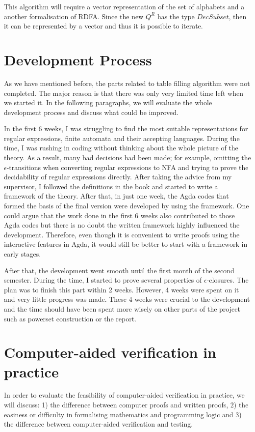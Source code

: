 \par This algorithm will require a vector representation of the set of
alphabets and a another formalisation of RDFA. Since the new \(Q^R\) has
the type \(DecSubset\), then it can be represented by a vector and
thus it is possible to iterate. 


\section{Development Process}
\par As we have mentioned before, the parts related to table filling algorithm were not completed. The major reason is
that there was only very limited time left when we started it. In the following paragraphs, we will evaluate the whole
development process and discuss what could be improved. 

\par In the first 6 weeks, I was struggling to find
the most suitable representations for regular expressions, finite
automata and their accepting languages. During the time, I was
rushing in coding without thinking about the whole picture of
the theory. As a result, many bad decisions had been made; for example, omitting the
\(\epsilon\)-transitions when converting regular expressions to NFA and trying to prove
the decidability of regular expressions directly. After taking the
advice from my supervisor, I followed the definitions in the
book \cite{aho1972} and started to write a framework of the
theory. After that, in just one week, the Agda
codes that formed the basis of the final version were developed by
using the framework. One could argue that the work
done in the first 6 weeks also contributed to those Agda codes but
there is no doubt the written framework highly influenced the
development. Therefore, even though it is convenient to write proofs
using the interactive features in Agda,
it would still be better to start with a framework in early stages. 

\par After that, the development went smooth until the first month of
the second semester. During the time, I started to prove several
properties of \(\epsilon\)-closures. The plan was to finish this part
within 2 weeks. However, 4 weeks were spent on it and very little
progress was made. These 4 weeks were crucial to the development and
the time should have been spent more wisely on other parts of the
project such as powerset construction or the report. 


\section{Computer-aided verification in practice}
\par In order to evaluate the feasibility of computer-aided verification in
practice, we will discuss: 1) the difference between computer proofs and written proofs, 2) the easiness or
difficulty in formalising mathematics and programming logic and 3) the
difference between computer-aided verification and testing. 


